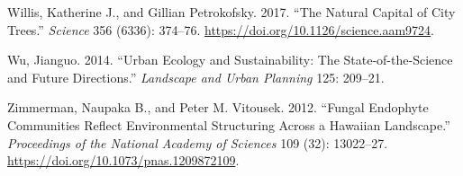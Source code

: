 \documentclass[fleqn,10pt,lineno]{wlpeerj} %
\newlength{\cslhangindent}
\newenvironment{CSLReferences}[2] %
 {%
  \setlength{\parindent}{0pt}
  \ifodd #1 \everypar{\setlength{\hangindent}{\cslhangindent}}\ignorespaces\fi
  \ifnum #2 > 0
  \setlength{\parskip}{#2\baselineskip}
  \fi
 }%
 {}
\begin{document}
\begin{CSLReferences}{1}{0}
\leavevmode{}%
Willis, Katherine J., and Gillian Petrokofsky. 2017. {``The Natural Capital of City Trees.''} \emph{Science} 356 (6336): 374--76. \url{https://doi.org/10.1126/science.aam9724}.

\leavevmode{}%
Wu, Jianguo. 2014. {``Urban Ecology and Sustainability: The State-of-the-Science and Future Directions.''} \emph{Landscape and Urban Planning} 125: 209--21.

\leavevmode{}%
Zimmerman, Naupaka B., and Peter M. Vitousek. 2012. {``Fungal Endophyte Communities Reflect Environmental Structuring Across a Hawaiian Landscape.''} \emph{Proceedings of the National Academy of Sciences} 109 (32): 13022--27. \url{https://doi.org/10.1073/pnas.1209872109}.

\end{CSLReferences}
\end{document}
